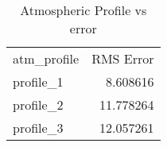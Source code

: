 \begin{table}
\caption{Atmospheric Profile vs error}
\begin{tabular}{lr}
atm_profile & RMS Error \\
profile_1 & 8.608616 \\
profile_2 & 11.778264 \\
profile_3 & 12.057261 \\
\end{tabular}
\end{table}
